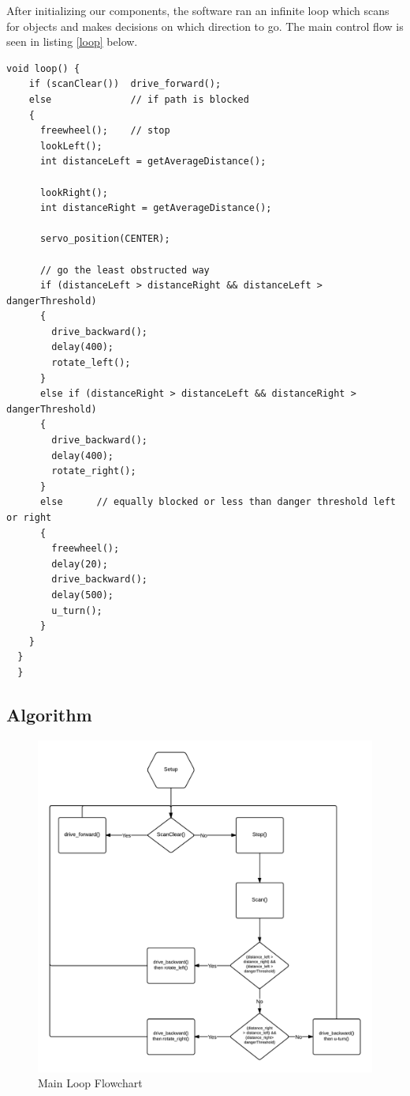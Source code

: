\documentclass[11pt]{article}
\begin{document}
%

After initializing our components, the software ran an infinite loop which scans for objects and makes decisions on which direction to go.  The main control flow is seen in listing \ref{loop} below.

\vspace{12pt}

 \begin{lstlisting}[caption=Control Loop, label=loop]		
  void loop() {
    if (scanClear())  drive_forward(); 
    else              // if path is blocked
    {
      freewheel();    // stop
      lookLeft();
      int distanceLeft = getAverageDistance();

      lookRight();
      int distanceRight = getAverageDistance();
      
      servo_position(CENTER);

      // go the least obstructed way
      if (distanceLeft > distanceRight && distanceLeft > dangerThreshold)       
      {
        drive_backward();
        delay(400);
        rotate_left();
      }
      else if (distanceRight > distanceLeft && distanceRight > dangerThreshold) 
      {
        drive_backward();
        delay(400);
        rotate_right();
      }
      else 		// equally blocked or less than danger threshold left or right
      {
        freewheel();
        delay(20);
        drive_backward();
        delay(500);
        u_turn();
      }   
    } 
  }  
  }
  \end{lstlisting}



\subsection{Algorithm}

	\begin{figure}[h]\centering
	\includegraphics[height=0.85\textwidth]{images/main.png}
	\caption{Main Loop Flowchart}
		\label{main}
	\end{figure}
\end{document}
